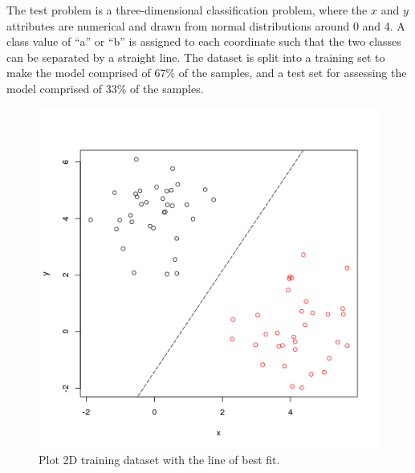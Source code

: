The test problem is a three-dimensional classification problem, where the $x$ and $y$ attributes are numerical and drawn from normal distributions around 0 and 4. A class value of ``a'' or ``b'' is assigned to each coordinate such that the two classes can be separated by a straight line. The dataset is split into a training set to make the model comprised of 67\% of the samples, and a test set for assessing the model comprised of 33\% of the samples.



\begin{figure}[htp]
\centering
\includegraphics[scale=0.45]{a_regression/logistic_regression_result.png}
\caption{Plot 2D training dataset with the line of best fit.}
\label{plot:logistic_regression_result}
\end{figure}


